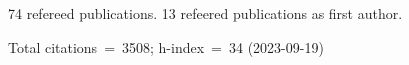 74 refereed publications. 13 refeered publications as first author.

Total citations~=~3508; h-index~=~34 (2023-09-19)